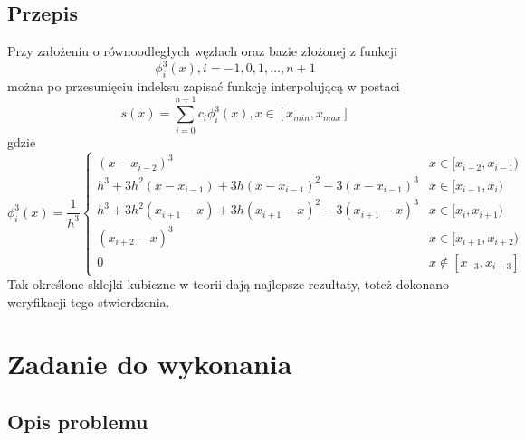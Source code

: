 \subsection{Przepis}

Przy założeniu o równoodległych węzłach oraz bazie złożonej z funkcji 
\begin{equation}
\phi_i^3(x), i = -1, 0, 1, \dots, n+1
\end{equation}
można po przesunięciu indeksu zapisać funkcję interpolującą w postaci
\begin{equation}
s(x) = \sum_{i = 0}^{n + 1}c_i\phi_i^3(x), x\in [x_{min}, x_{max}]
\label{es}
\end{equation}
gdzie
\begin{equation}
	\phi_i^3(x) = \frac{1}{h^3} 
	\begin{cases}
		(x - x_{i-2})^3 &x\in[x_{i-2},x_{i-1})\\
		h^3 + 3h^2(x-x_{i-1}) + 3h(x-x_{i-1})^2 -3(x-x_{i-1})^3 &x\in[x_{i-1},x_{i})\\
		h^3 + 3h^2(x_{i+1}-x) + 3h(x_{i+1}-x)^2 -3(x_{i+1}-x)^3&x\in[x_{i},x_{i+1}) \\
		(x_{i+2}-x)^3 &x\in[x_{i+1},x_{i+2})\\
		0&x\notin[x_{-3},x_{i+3}]
	\end{cases}
	\label{przepis}
\end{equation}
Tak określone sklejki kubiczne w teorii dają najlepsze rezultaty, toteż dokonano weryfikacji tego stwierdzenia.

\section{Zadanie do wykonania}

\subsection{Opis problemu}

